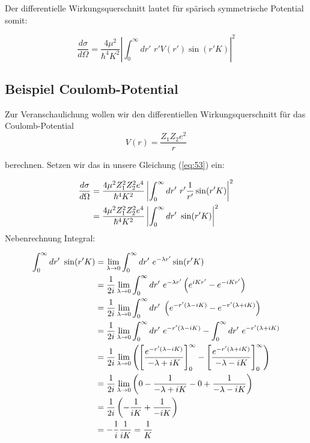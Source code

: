 Der differentielle Wirkungsquerschnitt lautet für spärisch symmetrische Potential somit:

\begin{equation}
  \label{eq:53}
  \boxed{ \frac{d\sigma}{d\Omega}=  \frac{4\mu^2}{\hbar^4 K^2} \left| \int_0^\infty dr'\,\, r'  V(r') \sin(r'K)   \right|^2 }
\end{equation}



\subsection*{Beispiel Coulomb-Potential}


Zur Veranschaulichung wollen wir den differentiellen Wirkungsquerschnitt für das Coulomb-Potential 
\begin{equation}
  \label{eq:54}
  V(r) = \frac{Z_1Z_2e^2}{r}
\end{equation}

berechnen. Setzen wir das in unsere Gleichung (\ref{eq:53}) ein:

\begin{align}
  \label{eq:55}
  \frac{d\sigma}{d\Omega}&=  \frac{4\mu^2Z_1^2Z_2^2e^4}{\hbar^4 K^2} \left| \int_0^\infty dr'\,\, r'  \frac{1}{r'} \sin(r'K)   \right|^2 \notag\\
&=  \frac{4\mu^2Z_1^2Z_2^2e^4}{\hbar^4 K^2} \left| \int_0^\infty dr'\,\, \sin(r'K)   \right|^2 
\end{align}
Nebenrechnung Integral:

\begin{align}
  \label{eq:56}
 \int_0^\infty dr'\,\, \sin(r'K) &= \lim_{\lambda \to 0} \int_0^\infty dr'\,\, e^{-\lambda r'}  \sin(r'K)\notag \\
&= \frac{1}{2i}  \lim_{\lambda \to 0} \int_0^\infty dr'\,\, e^{-\lambda r'}\left( e^{iK r'}- e^{-iK r'} \right) \notag \\
&= \frac{1}{2i}  \lim_{\lambda \to 0} \int_0^\infty dr'\,\, \left( e^{-r'(\lambda - iK )}- e^{-r'(\lambda+iK)} \right) \notag \\
&= \frac{1}{2i}  \lim_{\lambda \to 0} \int_0^\infty dr'\,\, e^{-r'(\lambda - iK )}- \int_0^\infty dr'\,\, e^{-r'(\lambda+iK)} \notag \\
&= \frac{1}{2i}  \lim_{\lambda \to 0}\left( \left[ \frac{e^{-r'(\lambda - iK )} }{-\lambda+iK}  \right]_0^\infty - \left[ \frac{e^{-r'(\lambda + iK )} }{-\lambda-iK}  \right]_0^\infty \right)\notag \\
&= \frac{1}{2i}  \lim_{\lambda \to 0}\left( 0 - \frac{1}{-\lambda+iK}   -  0  +  \frac{1}{-\lambda-iK}  \right) \notag\\
&= \frac{1}{2i}  \left( -\frac{1}{iK}   +  \frac{1}{-iK}  \right)\notag \\
&= - \frac{1}{i} \frac{1}{iK} =  \frac{1}{K} 
\end{align}

